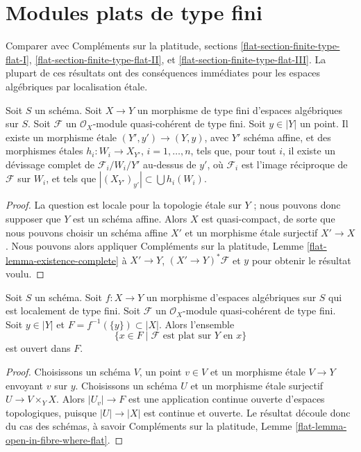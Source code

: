 \section{Modules plats de type fini}
\label{section-finite-type-flat}

\noindent
Comparer avec
Compléments sur la platitude, sections
\ref{flat-section-finite-type-flat-I},
\ref{flat-section-finite-type-flat-II}, et
\ref{flat-section-finite-type-flat-III}.
La plupart de ces résultats ont des conséquences immédiates
pour les espaces algébriques par localisation \'etale.

\begin{lemma}
\label{lemma-existence-complete}
Soit $S$ un schéma.
Soit $X \to Y$ un morphisme de type fini d'espaces algébriques sur $S$.
Soit $\mathcal{F}$ un $\mathcal{O}_X$-module quasi-cohérent de type fini.
Soit $y \in |Y|$ un point. Il existe un morphisme \'etale
$(Y', y') \to (Y, y)$, avec $Y'$ schéma affine, et des morphismes \'etales
$h_i : W_i \to X_{Y'}$, $i = 1, \ldots, n$, tels que, pour tout
$i$, il existe un dévissage complet de $\mathcal{F}_i/W_i/Y'$ au-dessus de $y'$,
où $\mathcal{F}_i$ est l'image réciproque de $\mathcal{F}$ sur $W_i$,
et tels que $|(X_{Y'})_{y'}| \subset \bigcup h_i(W_i)$.
\end{lemma}

\begin{proof}
La question est locale pour la topologie \'etale sur $Y$ ; nous pouvons donc supposer que $Y$
est un schéma affine. Alors $X$ est quasi-compact, de sorte que nous pouvons
choisir un schéma affine $X'$ et un morphisme \'etale surjectif
$X' \to X$. Nous pouvons alors appliquer
Compléments sur la platitude, Lemme \ref{flat-lemma-existence-complete}
à $X' \to Y$, $(X' \to Y)^*\mathcal{F}$ et $y$ pour
obtenir le résultat voulu.
\end{proof}

\begin{lemma}
\label{lemma-open-in-fibre-where-flat}
Soit $S$ un schéma.
Soit $f : X \to Y$ un morphisme d'espaces algébriques sur $S$
qui est localement de type fini.
Soit $\mathcal{F}$ un $\mathcal{O}_X$-module quasi-cohérent de type fini.
Soit $y \in |Y|$ et $F = f^{-1}(\{y\}) \subset |X|$. Alors l'ensemble
$$
\{x \in F \mid \mathcal{F} \text{ est plat sur }Y\text{ en }x\}
$$
est ouvert dans $F$.
\end{lemma}

\begin{proof}
Choisissons un schéma $V$, un point $v \in V$ et un morphisme \'etale $V \to Y$
envoyant $v$ sur $y$. Choisissons un schéma $U$ et un morphisme \'etale surjectif
$U \to V \times_Y X$. Alors $|U_v| \to F$ est une application continue ouverte
d'espaces topologiques, puisque $|U| \to |X|$ est continue et ouverte.
Le résultat découle donc du cas des schémas, à savoir
Compléments sur la platitude, Lemme \ref{flat-lemma-open-in-fibre-where-flat}.
\end{proof}


